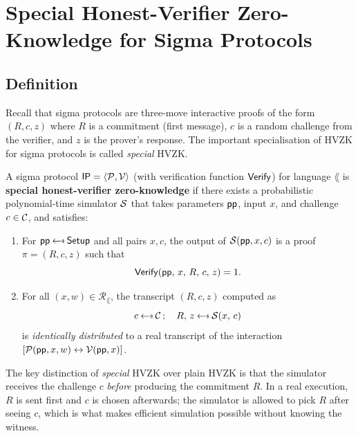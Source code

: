 \documentclass[11pt]{article}
\begin{document}
\section{Special Honest-Verifier Zero-Knowledge for Sigma Protocols}

\subsection{Definition}

Recall that sigma protocols are three-move interactive proofs of the form
$(R, c, z)$ where $R$ is a commitment (first message), $c$ is a random
challenge from the verifier, and $z$ is the prover's response.  The
important specialisation of HVZK for sigma protocols is called
\emph{special} HVZK.

\begin{tcolorbox}[colback=blue!5!white, colframe=blue!60!black,
                  title={Definition: Special Honest-Verifier Zero-Knowledge}]
A sigma protocol $\mathsf{IP} = \langle \mathcal{P}, \mathcal{V} \rangle$ (with
verification function $\mathsf{Verify}$) for language $\lang$ is
\textbf{special honest-verifier zero-knowledge} if there exists a
probabilistic polynomial-time simulator $\mathcal{S}$ that takes parameters
$\mathsf{pp}$, input $x$, and challenge $c \in \mathcal{C}$, and satisfies:

\begin{enumerate}
  \item For $\pp \getsr \Setup$ and all pairs $x, c$, the output of
        $\mathcal{S}(\mathsf{pp}, x, c)$ is a proof $\pi = (R, c, z)$ such that
        \[
          \mathsf{Verify}(\mathsf{pp},\, x,\, R,\, c,\, z) = 1.
        \]

  \item For all $(x, w) \in \mathcal{R}_{\lang}$, the transcript $(R, c, z)$
        computed as
        \[
          c \getsr \calC\,;\quad R,\, z \getsr \Sim(x,\, c)
        \]
        is \emph{identically distributed} to a real transcript of the
        interaction $[\mathcal{P}(\mathsf{pp}, x, w) \leftrightarrow \mathcal{V}(\mathsf{pp}, x)]$.
\end{enumerate}
\end{tcolorbox}

\begin{remark}
The key distinction of \emph{special} HVZK over plain HVZK is that
the simulator receives the challenge $c$ \emph{before} producing the
commitment $R$.  In a real execution, $R$ is sent first and $c$ is
chosen afterwards; the simulator is allowed to pick $R$ after seeing
$c$, which is what makes efficient simulation possible without knowing
the witness.
\end{remark}
\end{document}
